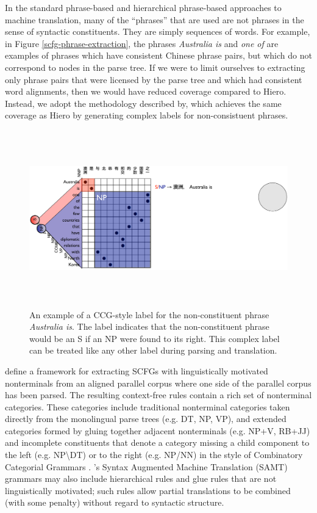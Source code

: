 In the standard phrase-based and hierarchical phrase-based approaches to machine translation, many of the ``phrases'' that are used are not phrases in the sense of syntactic constituents.  They are simply sequences of words.  For example, in Figure \ref{scfg-phrase-extraction}, the phrases {\it Australia is} and {\it one of} are examples of phrases which have consistent Chinese phrase pairs, but which do not correspond to nodes in the parse tree.  If we were to limit ourselves to extracting only phrase pairs that were licensed by the parse tree and which had consistent word alignments, then we would have reduced coverage compared to Hiero.  Instead, we adopt the methodology described by\citet{samt}, which achieves the same coverage as Hiero by generating complex labels for non-consistuent phrases.  


\begin{figure}
\begin{center}
\includegraphics[height=3in]{SCFGs/scfg-ccg-phrase-extraction.pdf}
\end{center}
\caption{An example of a CCG-style label for the non-constituent phrase {\it Australia is}.  The label indicates that the non-constituent phrase would be an S if an NP were found to its right.  This complex label can be treated like any other label during parsing and translation. }\label{scfg-ccg-phrase-extraction}
\end{figure}


\citet{samt} define a framework for extracting SCFGs with linguistically motivated nonterminals from an aligned parallel corpus where one side of the parallel corpus has been parsed. The resulting context-free rules contain a rich set of nonterminal categories. These categories include traditional nonterminal categories taken directly from the monolingual parse trees (e.g. DT, NP, VP), and extended categories formed by gluing together adjacent nonterminals (e.g. NP+V, RB+JJ) and incomplete constituents that denote a category missing a child component to the left (e.g.  NP\textbackslash DT) or to the right (e.g. NP/NN) in the style of Combinatory Categorial Grammars \cite{ccg1982}.   \citet{samt}'s Syntax Augmented Machine Translation (SAMT) grammars may also include hierarchical rules and glue rules \cite{chiang:2007} that are not linguistically motivated; such rules allow partial translations to be combined (with some penalty) without regard to syntactic structure.



